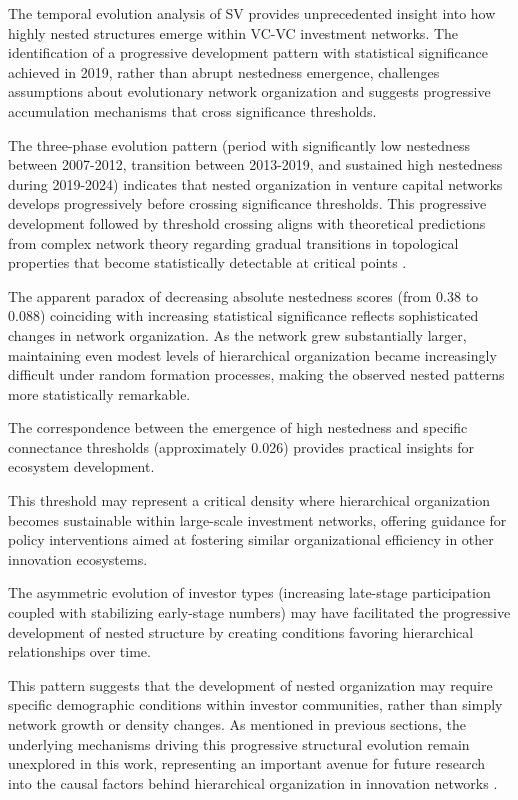 The temporal evolution analysis of SV provides unprecedented insight into how highly nested structures emerge within VC-VC investment networks. The identification of a progressive development pattern with statistical significance achieved in 2019, rather than abrupt nestedness emergence, challenges assumptions about evolutionary network organization and suggests progressive accumulation mechanisms that cross significance thresholds.

The three-phase evolution pattern (period with significantly low nestedness between 2007-2012, transition between 2013-2019, and sustained high nestedness during 2019-2024) indicates that nested organization in venture capital networks develops progressively before crossing significance thresholds. This progressive development followed by threshold crossing aligns with theoretical predictions from complex network theory regarding gradual transitions in topological properties that become statistically detectable at critical points \cite{Mariani2019}.

The apparent paradox of decreasing absolute nestedness scores (from 0.38 to 0.088) coinciding with increasing statistical significance reflects sophisticated changes in network organization. As the network grew substantially larger, maintaining even modest levels of hierarchical organization became increasingly difficult under random formation processes, making the observed nested patterns more statistically remarkable. 

The correspondence between the emergence of high nestedness and specific connectance thresholds (approximately 0.026) provides practical insights for ecosystem development. 

This threshold may represent a critical density where hierarchical organization becomes sustainable within large-scale investment networks, offering guidance for policy interventions aimed at fostering similar organizational efficiency in other innovation ecosystems.

The asymmetric evolution of investor types (increasing late-stage participation coupled with stabilizing early-stage numbers) may have facilitated the progressive development of nested structure by creating conditions favoring hierarchical relationships over time. 

This pattern suggests that the development of nested organization may require specific demographic conditions within investor communities, rather than simply network growth or density changes. As mentioned in previous sections, the underlying mechanisms driving this progressive structural evolution remain unexplored in this work, representing an important avenue for future research into the causal factors behind hierarchical organization in innovation networks \cite{Mariani2019, Hochberg2007, Uzzi1997}.

